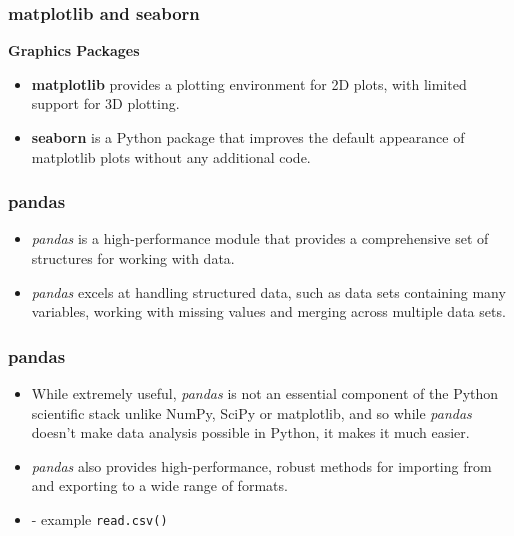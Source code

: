 \begin{frame}
\frametitle{matplotlib and seaborn}
\large
	\vspace{-0.4cm}
\textbf{Graphics Packages}
\begin{itemize}
\item \textbf{matplotlib} provides a plotting environment for 2D plots, with limited support for 3D plotting. 
\item \textbf{seaborn} is
a Python package that improves the default appearance of matplotlib plots without any additional code.
\end{itemize}

\end{frame}
\begin{frame}
\frametitle{pandas}
\Large
\begin{itemize}
\item 	\textit{pandas} is a high-performance module that provides a comprehensive set of structures for working with
data. 
\item \textit{pandas} excels at handling structured data, such as data sets containing many variables, working with
missing values and merging across multiple data sets. 
\end{itemize}
\end{frame}

\begin{frame}
	\large
	\frametitle{pandas}	
	\large
	\begin{itemize}
	
	\item While extremely useful, \textit{pandas} is not an essential component of the Python scientific stack unlike NumPy, SciPy or matplotlib, and so while \textit{pandas} doesn’t
	make data analysis possible in Python, it makes it much easier. \item \textit{pandas} also provides high-performance,
	robust methods for importing from and exporting to a wide range of formats.
	\item - example \texttt{read.csv()}
	\end{itemize}
\end{frame}
\begin{frame}


\end{frame}